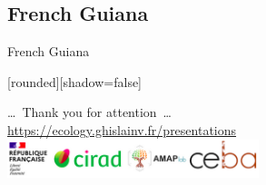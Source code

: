 \documentclass[10pt,table,dvipsnames,compress]{beamer}
\begin{document}
\subsection{French Guiana}
\label{sec:org8a1229e}

\begin{frame}[label={sec:orgcdd2624}]{French Guiana}
\end{frame}


{
  [rounded][shadow=false]
  \begin{frame}[plain]
    \begin{block}{}
      \begin{center}
        \ldots~Thank you for attention~\ldots \\
        \url{https://ecology.ghislainv.fr/presentations} \\
        \includegraphics[width=0.55\textwidth]{figs/partners_logos}
      \end{center}
    \end{block}
  \end{frame}
}
\end{document}
